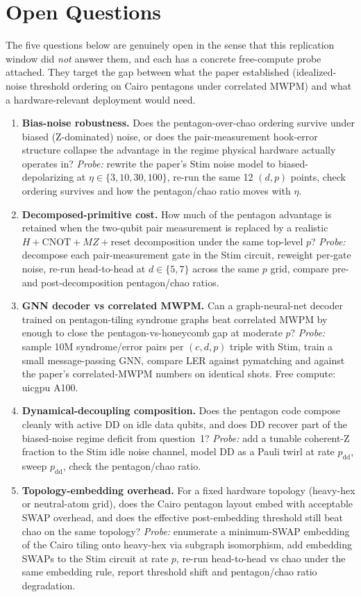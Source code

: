 \section{Open Questions}

The five questions below are genuinely open in the sense that this
replication window did \emph{not} answer them, and each has a concrete
free-compute probe attached. They target the gap between what the paper
established (idealized-noise threshold ordering on Cairo pentagons under
correlated MWPM) and what a hardware-relevant deployment would need.

\begin{enumerate}
\item \textbf{Bias-noise robustness.} Does the pentagon-over-chao ordering
survive under biased (Z-dominated) noise, or does the pair-measurement
hook-error structure collapse the advantage in the regime physical hardware
actually operates in?
\emph{Probe:} rewrite the paper's Stim noise model to biased-depolarizing at
$\eta\in\{3,10,30,100\}$, re-run the same 12 $(d,p)$ points, check ordering
survives and how the pentagon/chao ratio moves with $\eta$.

\item \textbf{Decomposed-primitive cost.} How much of the pentagon advantage
is retained when the two-qubit pair measurement is replaced by a realistic
$H+\text{CNOT}+MZ+\text{reset}$ decomposition under the same top-level $p$?
\emph{Probe:} decompose each pair-measurement gate in the Stim circuit,
reweight per-gate noise, re-run head-to-head at $d\in\{5,7\}$ across the
same $p$ grid, compare pre- and post-decomposition pentagon/chao ratios.

\item \textbf{GNN decoder vs correlated MWPM.} Can a graph-neural-net decoder
trained on pentagon-tiling syndrome graphs beat correlated MWPM by enough
to close the pentagon-vs-honeycomb gap at moderate $p$?
\emph{Probe:} sample 10M syndrome/error pairs per $(c,d,p)$ triple with
Stim, train a small message-passing GNN, compare LER against pymatching and
against the paper's correlated-MWPM numbers on identical shots. Free
compute: uicgpu A100.

\item \textbf{Dynamical-decoupling composition.} Does the pentagon code
compose cleanly with active DD on idle data qubits, and does DD recover
part of the biased-noise regime deficit from question~1?
\emph{Probe:} add a tunable coherent-Z fraction to the Stim idle noise
channel, model DD as a Pauli twirl at rate $p_{\text{dd}}$, sweep
$p_{\text{dd}}$, check the pentagon/chao ratio.

\item \textbf{Topology-embedding overhead.} For a fixed hardware topology
(heavy-hex or neutral-atom grid), does the Cairo pentagon layout embed with
acceptable SWAP overhead, and does the effective post-embedding threshold
still beat chao on the same topology?
\emph{Probe:} enumerate a minimum-SWAP embedding of the Cairo tiling onto
heavy-hex via subgraph isomorphism, add embedding SWAPs to the Stim circuit
at rate $p$, re-run head-to-head vs chao under the same embedding rule,
report threshold shift and pentagon/chao ratio degradation.
\end{enumerate}
